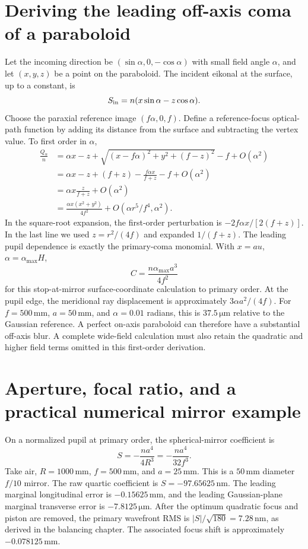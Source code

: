 \section{Deriving the leading off-axis coma of a paraboloid}
Let the incoming direction be $(\sin\alpha,0,-\cos\alpha)$ with small
field angle $\alpha$, and let $(x,y,z)$ be a point on the paraboloid. The
incident eikonal at the surface, up to a constant, is
\begin{equation}
 S_{\rm in}=n(x\sin\alpha-z\cos\alpha).
\end{equation}
Choose the paraxial reference image $(f\alpha,0,f)$. Define a reference-focus
optical-path function by adding its distance from the surface and subtracting
the vertex value. To first order in $\alpha$,
\begin{align}
 \frac{Q_\alpha}{n}
 &=\alpha x-z+
   \sqrt{(x-f\alpha)^2+y^2+(f-z)^2}-f+O(\alpha^2)\\
 &=\alpha x-z+(f+z)-\frac{f\alpha x}{f+z}-f+O(\alpha^2)\\
 &=\alpha x\frac{z}{f+z}+O(\alpha^2)\\
 &=\frac{\alpha x(x^2+y^2)}{4f^2}
        +O(\alpha r^5/f^4,\alpha^2).
 \label{ab:parabolacoma}
\end{align}
In the square-root expansion, the first-order perturbation is
$-2f\alpha x/[2(f+z)]$. In the last line we used
$z=r^2/(4f)$ and expanded $1/(f+z)$. The leading pupil dependence is exactly
the primary-coma monomial. With $x=au$, $\alpha=\alpha_{\max}H$,
\begin{equation}
 C=\frac{n\alpha_{\max}a^3}{4f^2}
\end{equation}
for this stop-at-mirror surface-coordinate calculation to primary order.
At the pupil edge, the meridional ray displacement is approximately
$3\alpha a^2/(4f)$. For $f=500\,\mathrm{mm}$, $a=50\,\mathrm{mm}$,
and $\alpha=0.01$ radians, this is $37.5\,\mathrm{\mu m}$ relative to the
Gaussian reference. A perfect on-axis paraboloid can therefore have a
substantial off-axis blur. A complete wide-field calculation must also retain
the quadratic and higher field terms omitted in this first-order derivation.

\section{Aperture, focal ratio, and a practical numerical mirror example}
On a normalized pupil at primary order, the spherical-mirror coefficient is
\begin{equation}
 S=-\frac{na^4}{4R^3}=-\frac{na^4}{32f^3}.
\end{equation}
Take air, $R=1000\,\mathrm{mm}$, $f=500\,\mathrm{mm}$, and
$a=25\,\mathrm{mm}$. This is a $50\,\mathrm{mm}$ diameter $f/10$ mirror.
The raw quartic coefficient is $S=-97.65625\,\mathrm{nm}$. The leading
marginal longitudinal error is $-0.15625\,\mathrm{mm}$, and the leading
Gaussian-plane marginal transverse error is $-7.8125\,\mathrm{\mu m}$.
After the optimum quadratic focus and piston are removed, the primary
wavefront RMS is $|S|/\sqrt{180}=7.28\,\mathrm{nm}$, as derived in the
balancing chapter. The associated focus shift is approximately
$-0.078125\,\mathrm{mm}$.

